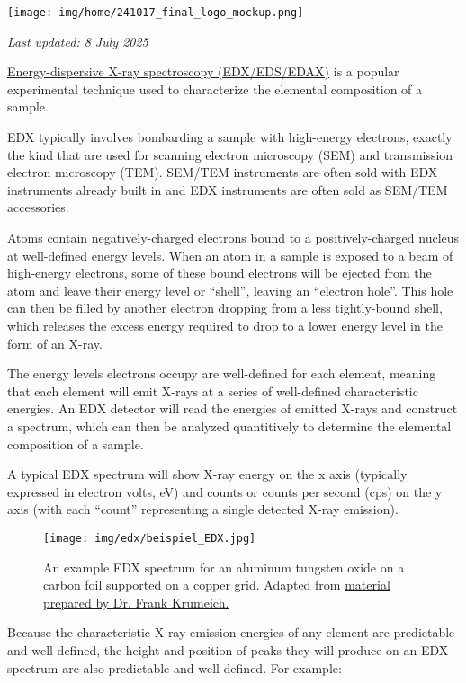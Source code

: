 \documentclass[letterpaper, 12pt]{article}
\begin{document}
\flushleft\texttt{[image: img/home/241017\_final\_logo\_mockup.png]}

\textit{Last updated: 8 July 2025}

\href{https://en.wikipedia.org/wiki/Energy-dispersive_X-ray_spectroscopy}{Energy-dispersive X-ray spectroscopy (EDX/EDS/EDAX)} is a popular experimental technique used to characterize the elemental composition of a sample.

EDX typically involves bombarding a sample with high-energy electrons, exactly the kind that are used for scanning electron microscopy (SEM) and transmission electron microscopy (TEM). SEM/TEM instruments are often sold with EDX instruments already built in and EDX instruments are often sold as SEM/TEM accessories.

Atoms contain negatively-charged electrons bound to a positively-charged nucleus at well-defined energy levels. When an atom in a sample is exposed to a beam of high-energy electrons, some of these bound electrons will be ejected from the atom and leave their energy level or ``shell'', leaving an ``electron hole''. This hole can then be filled by another electron dropping from a less tightly-bound shell, which releases the excess energy required to drop to a lower energy level in the form of an X-ray.

The energy levels electrons occupy are well-defined for each element, meaning that each element will emit X-rays at a series of well-defined characteristic energies. An EDX detector will read the energies of emitted X-rays and construct a spectrum, which can then be analyzed quantitively to determine the elemental composition of a sample.

A typical EDX spectrum will show X-ray energy on the x axis (typically expressed in electron volts, eV) and counts or counts per second (cps) on the y axis (with each ``count'' representing a single detected X-ray emission).

\begin{figure}[h!tbp]
    \texttt{[image: img/edx/beispiel\_EDX.jpg]}
    \caption*{ An example EDX spectrum for an aluminum tungsten oxide on a carbon foil supported on a copper grid. Adapted from \href{https://www.microscopy.ethz.ch/xray_spectrum.htm}{material prepared by Dr. Frank Krumeich.}}
\end{figure}

\pagebreak

Because the characteristic X-ray emission energies of any element are predictable and well-defined, the height and position of peaks they will produce on an EDX spectrum are also predictable and well-defined. For example:
\end{document}
